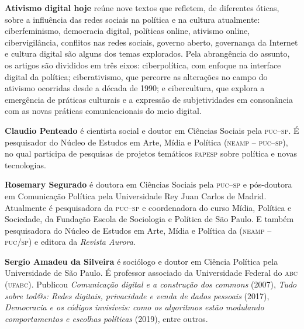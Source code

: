\textbf{Ativismo digital hoje} reúne nove textos que refletem, de diferentes óticas, sobre a influência das redes sociais na política e na cultura atualmente: ciberfeminismo, democracia digital, políticas online, ativismo online, cibervigilância, conflitos nas redes sociais, governo aberto, governança da Internet e cultura digital são alguns dos temas explorados.
Pela abrangência do assunto, os artigos são divididos em três eixos: ciberpolítica, com enfoque na interface digital da política; ciberativismo, que percorre as alterações no campo do ativismo ocorridas desde a década de 1990; e cibercultura, que explora a emergência de práticas culturais e a expressão de subjetividades em consonância com as novas práticas comunicacionais do meio digital.

\textbf{Claudio Penteado} é cientista social e doutor em Ciências Sociais pela \textsc{puc--sp}. É pesquisador do Núcleo de Estudos em Arte, Mídia e Política (\textsc{neamp -- puc--sp}), no qual participa de pesquisas de projetos temáticos \textsc{fapesp} sobre política e novas tecnologias.

\textbf{Rosemary Segurado} é doutora em Ciências Sociais pela \textsc{puc--sp} e pós-doutora em Comunicação Política pela Universidade Rey Juan Carlos de Madrid. Atualmente é pesquisadora da \textsc{puc--sp} e coordenadora do curso Mídia, Política e Sociedade, da Fundação Escola de Sociologia e Política de São Paulo. 
E também pesquisadora do Núcleo de Estudos em Arte, Mídia e Política da (\textsc{neamp -- puc/sp}) e editora da \textit{Revista Aurora}.

\textbf{Sergio Amadeu da Silveira} é sociólogo e doutor em Ciência Política pela Universidade de São Paulo. É professor associado da Universidade Federal do \textsc{abc} (\textsc{ufabc}). Publicou \textit{Comunicação digital e a construção dos commons} (2007), \textit{Tudo sobre tod@s: Redes digitais, privacidade e venda de dados pessoais} (2017), \textit{Democracia e os códigos invisíveis: como os algoritmos estão modulando comportamentos e escolhas políticas} (2019), entre outros.

